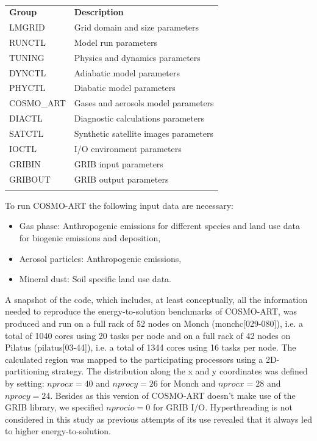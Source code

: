 \begin{table}[htbf]
  \begin{center}
    \caption{}
    \label{tab:1}
    \begin{tabular}{ll}
      \hline\noalign{\smallskip} 
      \textbf{Group} & \textbf{Description} \\
      \noalign{\smallskip}\hline\noalign{\smallskip}
      LMGRID & Grid domain and size parameters \\
      RUNCTL & Model run parameters \\
      TUNING & Physics and dynamics parameters \\
      DYNCTL & Adiabatic model parameters \\
      PHYCTL & Diabatic model parameters \\
      COSMO\_ART & Gases and aerosols model parameters \\
      DIACTL & Diagnostic calculations parameters \\
      SATCTL & Synthetic satellite images parameters \\
      IOCTL & I/O environment parameters \\
      GRIBIN & GRIB input parameters \\
      GRIBOUT & GRIB output parameters \\
     \noalign{\smallskip}\hline
    \end{tabular}
  \end{center}
\end{table}

\noindent
To run COSMO-ART the following input data are necessary:
\begin{itemize}
\item  Gas phase:  Anthropogenic emissions  for different  species and
  land use data for biogenic emissions and deposition,
\item Aerosol particles: Anthropogenic emissions,
\item Mineral dust: Soil specific land use data.
\end{itemize}

A snapshot of the code, which includes, at least conceptually, all the
information needed  to reproduce the  energy-to-solution benchmarks of
COSMO-ART, was  produced and run on a  full rack of 52  nodes on Monch
(monchc[029-080]), i.e.  a total of 1040 cores using 20 tasks per node
and on  a full rack of  42 nodes on Pilatus  (pilatus[03-44]), i.e.  a
total of  1344 cores using 16  tasks per node.   The calculated region
was  mapped to  the participating  processors using  a 2D-partitioning
strategy.  The distribution along the  x and y coordinates was defined
by setting: $nprocx=40$ and  $nprocy=26$ for Monch and $nprocx=28$ and
$nprocy=24$.  Besides as this version of COSMO-ART doesn't make use of
the   GRIB   library,  we   specified   $nprocio=0$   for  GRIB   I/O.
Hyperthreading is not considered in this study as previous attempts of
its use revealed that it always led to higher energy-to-solution.\\

